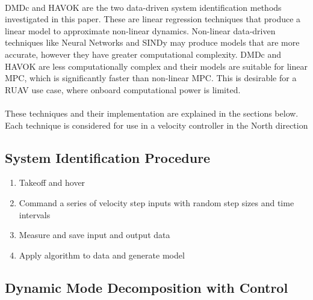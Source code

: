         \paragraph{}
        DMDc and HAVOK are the two data-driven system identification methods investigated in this paper. 
        These are linear regression techniques that produce a linear model to approximate non-linear dynamics.
        Non-linear data-driven techniques like Neural Networks and SINDy \cite{Brunton2016} may produce models that are more accurate, however they have greater computational complexity.
        DMDc and HAVOK are less computationally complex and their models are suitable for linear MPC, which is significantly faster than non-linear MPC.
        This is desirable for a RUAV use case, where onboard computational power is limited.
        
        \paragraph{}
        These techniques and their implementation are explained in the sections below.
        Each technique is considered for use in a velocity controller in the North direction

    \subsection{System Identification Procedure}

        \begin{enumerate}
            \item Takeoff and hover
            \item Command a series of velocity step inputs with random step sizes and time intervals
            \item Measure and save input and output data
            \item Apply algorithm to data and generate model
        \end{enumerate}


        
    \subsection{Dynamic Mode Decomposition with Control}
    \label{sec:dmdc}        

        
